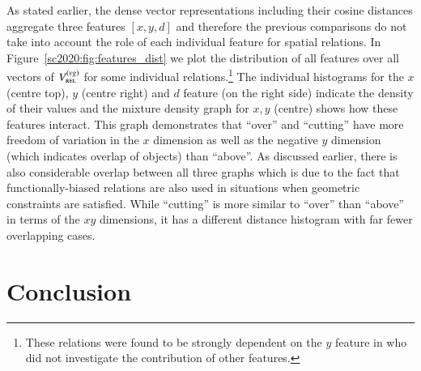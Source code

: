 As stated earlier, the dense vector representations including their
cosine distances aggregate three features $[x,y,d]$ and therefore the
previous comparisons do not take into account the role of each
individual feature for spatial relations.  In
Figure~\ref{sc2020:fig:features_dist} we plot the distribution of all
features over all vectors of $V_{\textsc{rel}}^{(vg)}$ for some
individual relations.\footnote{These relations were found to be
  strongly dependent on the $y$ feature in \cite{collell2018acquiring}
  who did not investigate the contribution of other features.}  The
individual histograms for the $x$ (centre top), $y$ (centre right) and
$d$ feature (on the right side) indicate the density of their values
and the mixture density graph for $x, y$ (centre) shows how these
features interact.
This graph demonstrates that ``over'' and ``cutting'' have more
freedom of variation in the $x$ dimension as well as the negative $y$
dimension (which indicates overlap of objects) than ``above''. As
discussed earlier, there is also considerable overlap between all
three graphs which is due to the fact that functionally-biased
relations are also used in situations when geometric constraints
are satisfied. While ``cutting'' is more similar to ``over'' than
``above'' in terms of the $xy$ dimensions, it has a different distance
histogram with far fewer overlapping cases.





\section{Conclusion}\label{sc2020:sec:conclusion}

